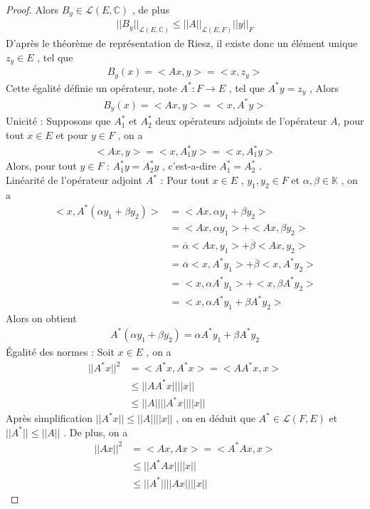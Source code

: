 \documentclass{report}
\begin{document}
{\begin{proof}
	 
Alors $B_y \in \mathscr{L}(E, \mathbb{C})$ , de plus
	\begin{align*}
		||B_y||_{\mathscr{L}(E, \mathbb{C})} \le ||A||_{\mathscr{L}(E, F)} ||y||_F  
	\end{align*}
D'après le théorème de représentation de Riesz, il existe donc un élément unique $z_y \in E$ , tel que 
	\begin{align*}
	 B_y(x) = < Ax, y > = < x, z_y > 
	\end{align*}
Cette égalité définie un opérateur, note $A^* : F \rightarrow E$ , tel que $A^* y = z_y$ , Alors   
	\begin{align*}
	 B_y(x) = < Ax, y > = < x, A^* y > 
	\end{align*}
Unicité : Supposons que $A^*_1$ et $A^*_2$ deux opérateurs adjoints de l'opérateur $A$, pour tout $x \in E$ et pour $y \in F$ , on a 
	\begin{align*}
	 < Ax, y > = < x, A^*_1 y > = < x, A^*_1 y > 
	\end{align*}
Alors, pour tout $y \in F$ : $A^*_1 y = A^*_2 y$ , c'est-a-dire $A^*_1 = A^*_2$ .\\
Linéarité de l'opérateur adjoint $A^*$ : Pour tout $x \in E$ , $y_1, y_2 \in F$ et $\alpha, \beta \in \mathbb{K}$ , on a 
	\begin{align*}	
				 < x, A^*(\alpha y_1 + \beta y_2) > &= < Ax, \alpha y_1 + \beta y_2 > \\
					 									 &= < Ax, \alpha y_1 > + < Ax, \beta y_2 > \\
					 									 &= \overline{\alpha} < Ax, y_1 > + \overline{\beta} < Ax, y_2 > \\
					 									 &= \overline{\alpha} < x, A^* y_1 > + \overline{\beta} < x, A^* y_2 > \\
					 									 &= < x, \alpha A^* y_1 > + < x, \beta A^* y_2 > \\
					 									 &= < x, \alpha A^* y_1 + \beta A^* y_2  >
	 \end{align*}
Alors on obtient 
	\begin{align*}
					 A^*(\alpha y_1 + \beta y_2) = \alpha A^* y_1 + \beta A^* y_2  
	\end{align*}
Égalité des normes : Soit $x \in E$ , on a 
	\begin{align*}				 ||A^* x||^2 &= < A^* x, A^* x > = < A A^* x, x >  \\
					 			  &\le ||A A^* x|| ||x|| \\
					 			  &\le ||A|| ||A^* x|| ||x|| 
	\end{align*}
Après simplification $||A^* x|| \le ||A|| ||x||$ , on en déduit que $A^* \in \mathscr{L}(F,E)$ et $||A^*|| \le ||A||$ . De plus, on a 
\begin{align*}
					 ||A x||^2 &= < Ax, Ax > = < A^* A x, x > \\
					  		    &\le ||A^* A x|| ||x|| \\
					 			&\le ||A^*|| ||A x|| ||x|| 
\end{align*}




\end{proof}}
\end{document}
